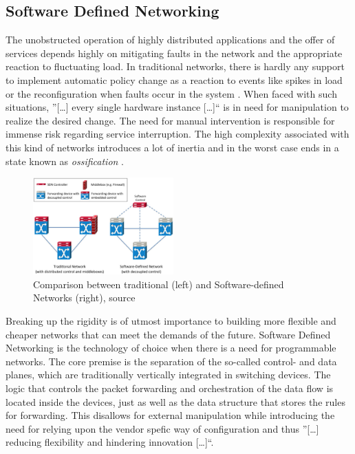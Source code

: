 \subsection{Software Defined Networking}
\label{sec:sdn}

The unobstructed operation of highly distributed applications and the offer of services depends highly on mitigating faults in the network and the appropriate reaction to fluctuating load. In traditional networks, there is hardly any support to implement automatic policy change as a reaction to events like spikes in load or the reconfiguration when faults occur in the system \cite{kreutz2015software}. When faced with such situations, ''[\dots] every single hardware instance [\dots]`` \cite{grossmann2013auto} is in need for manipulation to realize the desired change.  The need for manual intervention is responsible for immense risk regarding service interruption. The high complexity associated with this kind of networks introduces a lot of inertia and in the worst case ends in a state known as \textit{ossification} \cite{nunes2014survey}. 

\begin{figure}[H]
	\centering
	\includegraphics[width=0.48\textwidth]{images/sdn.png}
	\caption{Comparison between traditional (left) and Software-defined Networks (right), source \cite{li2015software}}
	\label{img:sdn}
\end{figure}

Breaking up the rigidity is of utmost importance to building more flexible and cheaper networks that can  meet the demands of the future. Software Defined Networking is the technology of choice when there is a need for programmable networks. The core premise is the separation of the so-called control- and data planes, which are traditionally vertically integrated in switching devices. The logic that controls the packet forwarding and orchestration of the data flow is located inside the devices, just as well as the data structure that stores the rules for forwarding. This disallows for external manipulation while introducing the need for relying upon the vendor spefic way of configuration and thus ''[\dots]  reducing flexibility and hindering innovation [\dots]``\cite{kreutz2015software}.

